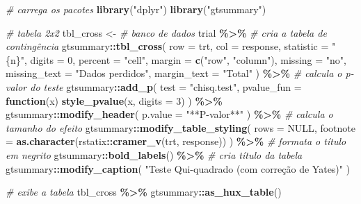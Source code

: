 \documentclass[
  a4paper,
]{book}
\newenvironment{Shaded}{\begin{snugshade}}{\end{snugshade}}
\newcommand{\AttributeTok}[1]{\textcolor[rgb]{0.13,0.29,0.53}{#1}}
\newcommand{\CommentTok}[1]{\textcolor[rgb]{0.56,0.35,0.01}{\textit{#1}}}
\newcommand{\ConstantTok}[1]{\textcolor[rgb]{0.56,0.35,0.01}{#1}}
\newcommand{\ControlFlowTok}[1]{\textcolor[rgb]{0.13,0.29,0.53}{\textbf{#1}}}
\newcommand{\DecValTok}[1]{\textcolor[rgb]{0.00,0.00,0.81}{#1}}
\newcommand{\FunctionTok}[1]{\textcolor[rgb]{0.13,0.29,0.53}{\textbf{#1}}}
\newcommand{\NormalTok}[1]{#1}
\newcommand{\OtherTok}[1]{\textcolor[rgb]{0.56,0.35,0.01}{#1}}
\newcommand{\SpecialCharTok}[1]{\textcolor[rgb]{0.81,0.36,0.00}{\textbf{#1}}}
\newcommand{\StringTok}[1]{\textcolor[rgb]{0.31,0.60,0.02}{#1}}
\begin{document}
\begin{Shaded}
\begin{Highlighting}[]
\CommentTok{\# carrega os pacotes}
\FunctionTok{library}\NormalTok{(}\StringTok{"dplyr"}\NormalTok{)}
\FunctionTok{library}\NormalTok{(}\StringTok{"gtsummary"}\NormalTok{)}

\CommentTok{\# tabela 2x2}
\NormalTok{tbl\_cross }\OtherTok{\textless{}{-}}
  \CommentTok{\# banco de dados}
\NormalTok{  trial }\SpecialCharTok{\%\textgreater{}\%}
  \CommentTok{\# cria a tabela de contingência}
\NormalTok{  gtsummary}\SpecialCharTok{::}\FunctionTok{tbl\_cross}\NormalTok{(}
    \AttributeTok{row =}\NormalTok{ trt,}
    \AttributeTok{col =}\NormalTok{ response,}
    \AttributeTok{statistic =} \StringTok{"\{n\}"}\NormalTok{,}
    \AttributeTok{digits =} \DecValTok{0}\NormalTok{,}
    \AttributeTok{percent =} \StringTok{"cell"}\NormalTok{,}
    \AttributeTok{margin =} \FunctionTok{c}\NormalTok{(}\StringTok{"row"}\NormalTok{, }\StringTok{"column"}\NormalTok{),}
    \AttributeTok{missing =} \StringTok{"no"}\NormalTok{,}
    \AttributeTok{missing\_text =} \StringTok{"Dados perdidos"}\NormalTok{,}
    \AttributeTok{margin\_text =} \StringTok{"Total"}
\NormalTok{  ) }\SpecialCharTok{\%\textgreater{}\%}
  \CommentTok{\# calcula o p{-}valor do teste}
\NormalTok{  gtsummary}\SpecialCharTok{::}\FunctionTok{add\_p}\NormalTok{(}
    \AttributeTok{test =} \StringTok{"chisq.test"}\NormalTok{,}
    \AttributeTok{pvalue\_fun =} \ControlFlowTok{function}\NormalTok{(x) }\FunctionTok{style\_pvalue}\NormalTok{(x, }\AttributeTok{digits =} \DecValTok{3}\NormalTok{)}
\NormalTok{  ) }\SpecialCharTok{\%\textgreater{}\%}
\NormalTok{  gtsummary}\SpecialCharTok{::}\FunctionTok{modify\_header}\NormalTok{(}
    \AttributeTok{p.value =} \StringTok{"**P{-}valor**"}
\NormalTok{  ) }\SpecialCharTok{\%\textgreater{}\%}
  \CommentTok{\# calcula o tamanho do efeito}
\NormalTok{  gtsummary}\SpecialCharTok{::}\FunctionTok{modify\_table\_styling}\NormalTok{(}
    \AttributeTok{rows =} \ConstantTok{NULL}\NormalTok{,}
    \AttributeTok{footnote =} \FunctionTok{as.character}\NormalTok{(rstatix}\SpecialCharTok{::}\FunctionTok{cramer\_v}\NormalTok{(trt, response))}
\NormalTok{  ) }\SpecialCharTok{\%\textgreater{}\%}
  \CommentTok{\# formata o título em negrito}
\NormalTok{  gtsummary}\SpecialCharTok{::}\FunctionTok{bold\_labels}\NormalTok{() }\SpecialCharTok{\%\textgreater{}\%}
  \CommentTok{\# cria título da tabela}
\NormalTok{  gtsummary}\SpecialCharTok{::}\FunctionTok{modify\_caption}\NormalTok{(}
    \StringTok{"Teste Qui{-}quadrado (com correção de Yates)"}
\NormalTok{  )}

\CommentTok{\# exibe a tabela}
\NormalTok{tbl\_cross }\SpecialCharTok{\%\textgreater{}\%}
\NormalTok{  gtsummary}\SpecialCharTok{::}\FunctionTok{as\_hux\_table}\NormalTok{()}
\end{Highlighting}
\end{Shaded}
\end{document}
